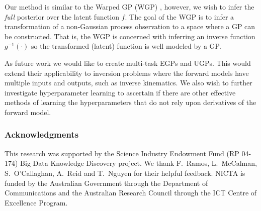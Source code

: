 \documentclass{article} %
\begin{document}
Our method is similar to the Warped GP (WGP) \cite{snelson2003warped}, however,
we wish to infer the \emph{full} posterior over the latent function $f$. The
goal of the WGP is to infer a transformation of a non-Gaussian process
observation to a space where a GP can be constructed. That is, the WGP is
concerned with inferring an inverse function $g^{-1}(\cdot)$ so the transformed
(latent) function is well modeled by a GP.

As future work we would like to create multi-task EGPs and UGPs. This would
extend their applicability to inversion problems where the forward models have
multiple inputs and outputs, such as inverse kinematics. We also wish to
further investigate hyperparameter learning to ascertain if there are other
effective methods of learning the hyperparameters that do not rely upon
derivatives of the forward model. 

\subsubsection*{Acknowledgments}
{
\small
This research was supported by the Science Industry Endowment Fund (RP 04-174)
Big Data Knowledge Discovery project. We thank F.\ Ramos, L.\ McCalman, 
S.\ O'Callaghan, A.\ Reid and T.\ Nguyen for 
their helpful feedback.
%
NICTA is funded by the Australian Government through the Department of
Communications and the Australian Research Council through the ICT Centre of
Excellence Program.
}



\end{document}
